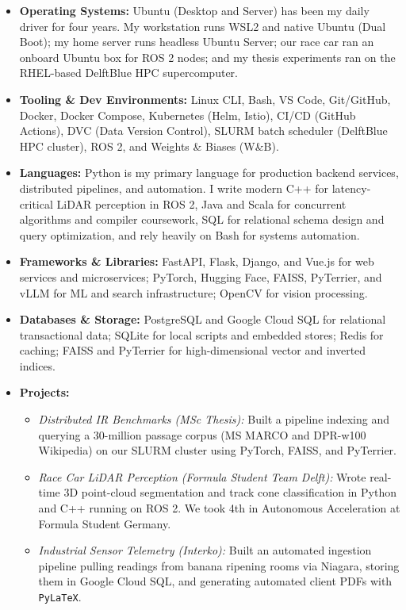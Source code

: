 \documentclass[letterpaper,11pt]{article}
\begin{document}
\begin{itemize}[leftmargin=0.2in, itemsep=3pt]
    \item \textbf{Operating Systems:} Ubuntu (Desktop and Server) has been my daily driver for four years. My workstation runs WSL2 and native Ubuntu (Dual Boot); my home server runs headless Ubuntu Server; our race car ran an onboard Ubuntu box for ROS 2 nodes; and my thesis experiments ran on the RHEL-based DelftBlue HPC supercomputer.
    \item \textbf{Tooling \& Dev Environments:} Linux CLI, Bash, VS Code, Git/GitHub, Docker, Docker Compose, Kubernetes (Helm, Istio), CI/CD (GitHub Actions), DVC (Data Version Control), SLURM batch scheduler (DelftBlue HPC cluster), ROS 2, and Weights \& Biases (W\&B).
    \item \textbf{Languages:} Python is my primary language for production backend services, distributed pipelines, and automation. I write modern C++ for latency-critical LiDAR perception in ROS 2, Java and Scala for concurrent algorithms and compiler coursework, SQL for relational schema design and query optimization, and rely heavily on Bash for systems automation.
    \item \textbf{Frameworks \& Libraries:} FastAPI, Flask, Django, and Vue.js for web services and microservices; PyTorch, Hugging Face, FAISS, PyTerrier, and vLLM for ML and search infrastructure; OpenCV for vision processing.
    \item \textbf{Databases \& Storage:} PostgreSQL and Google Cloud SQL for relational transactional data; SQLite for local scripts and embedded stores; Redis for caching; FAISS and PyTerrier for high-dimensional vector and inverted indices.
    \item \textbf{Projects:}
          \begin{itemize}[leftmargin=0.15in, itemsep=2pt]
              \item \textit{Distributed IR Benchmarks (MSc Thesis):} Built a pipeline indexing and querying a 30-million passage corpus (MS MARCO and DPR-w100 Wikipedia) on our SLURM cluster using PyTorch, FAISS, and PyTerrier.
              \item \textit{Race Car LiDAR Perception (Formula Student Team Delft):} Wrote real-time 3D point-cloud segmentation and track cone classification in Python and C++ running on ROS 2. We took 4th in Autonomous Acceleration at Formula Student Germany.
              \item \textit{Industrial Sensor Telemetry (Interko):} Built an automated ingestion pipeline pulling readings from banana ripening rooms via Niagara, storing them in Google Cloud SQL, and generating automated client PDFs with \texttt{PyLaTeX}.

\end{itemize}
\end{itemize}
\end{document}
